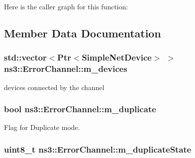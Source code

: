 Here is the caller graph for this function\+:




\subsection{Member Data Documentation}
\subsubsection[{\texorpdfstring{m\+\_\+devices}{m_devices}}]{\setlength{\rightskip}{0pt plus 5cm}std\+::vector$<${\bf Ptr}$<${\bf Simple\+Net\+Device}$>$ $>$ ns3\+::\+Error\+Channel\+::m\+\_\+devices\hspace{0.3cm}{\ttfamily [private]}}\hypertarget{classns3_1_1ErrorChannel_a4e248f728c932f51306a33b2266b9111}{}\label{classns3_1_1ErrorChannel_a4e248f728c932f51306a33b2266b9111}


devices connected by the channel 

\subsubsection[{\texorpdfstring{m\+\_\+duplicate}{m_duplicate}}]{\setlength{\rightskip}{0pt plus 5cm}bool ns3\+::\+Error\+Channel\+::m\+\_\+duplicate\hspace{0.3cm}{\ttfamily [private]}}\hypertarget{classns3_1_1ErrorChannel_aea4a0d1603a9af1355a1a24ee451bd3d}{}\label{classns3_1_1ErrorChannel_aea4a0d1603a9af1355a1a24ee451bd3d}


Flag for Duplicate mode. 

\subsubsection[{\texorpdfstring{m\+\_\+duplicate\+State}{m_duplicateState}}]{\setlength{\rightskip}{0pt plus 5cm}uint8\+\_\+t ns3\+::\+Error\+Channel\+::m\+\_\+duplicate\+State\hspace{0.3cm}{\ttfamily [private]}}\hypertarget{classns3_1_1ErrorChannel_a118fbf4ec58f791b2bc10796594a1999}{}\label{classns3_1_1ErrorChannel_a118fbf4ec58f791b2bc10796594a1999}


